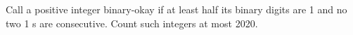 Call a positive integer binary-okay if at least half its binary digits are 1 and no two 1 s are consecutive. Count such integers at most 2020.
